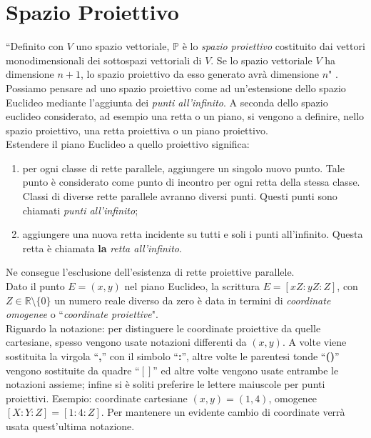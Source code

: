 \documentclass[a4paper,12pt]{tesiinfo}
\begin{document}
\section{Spazio Proiettivo}
``Definito con $V$ uno spazio vettoriale, $\mathbb{P}$ \`e lo \textit{spazio proiettivo} costituito dai vettori monodimensionali dei sottospazi vettoriali di $V$. Se lo spazio vettoriale $V$ ha dimensione $n+1$, lo spazio proiettivo da esso generato avr\`a dimensione $n$" \cite{baseTheory_ProjSpace}.
\\
Possiamo pensare ad uno spazio proiettivo come ad un'estensione dello spazio Euclideo mediante l'aggiunta dei \textit{punti all'infinito}. A seconda dello spazio euclideo considerato, ad esempio una retta o un piano, si vengono a definire, nello spazio proiettivo, una retta proiettiva o un piano proiettivo.
\\
Estendere il piano Euclideo \cite{baseTheory_Euclid2Proj_Space} a quello proiettivo significa:
\begin{enumerate}
 \item per ogni classe di rette parallele, aggiungere un singolo nuovo punto. Tale punto \`e considerato come punto di incontro per ogni retta della stessa classe. Classi di diverse rette parallele avranno diversi punti. Questi punti sono chiamati \textit{punti all'infinito};
 \item aggiungere una nuova retta incidente su tutti e soli i punti all'infinito. Questa retta \`e chiamata \textbf{la} \textit{retta all'infinito}.
\end{enumerate}
Ne consegue l'esclusione dell'esistenza di rette proiettive parallele.
\\
Dato il punto $E=(x, y)$ nel piano Euclideo, la scrittura $E=[xZ:yZ:Z]$, con $Z \in \mathbb{R} \setminus \{0\}$ un numero reale diverso da zero \`e data in termini di \textit{coordinate omogenee} o ``\textit{coordinate proiettive}".
\\
Riguardo la notazione: per distinguere le coordinate proiettive da quelle cartesiane, spesso vengono usate notazioni differenti da $(x, y)$. A volte viene sostituita la virgola ``\textbf{,}'' con il simbolo ``\textbf{:}'', altre volte le parentesi tonde ``\textbf{()}'' vengono sostituite da quadre ``\textbf{$\mathbb{[]}$}'' ed altre volte vengono usate entrambe le notazioni assieme; infine si \`e soliti preferire le lettere maiuscole per punti proiettivi. Esempio: coordinate cartesiane $(x, y) = (1, 4)$, omogenee $[X:Y:Z]=[1:4:Z]$. Per mantenere un evidente cambio di coordinate verr\`a usata quest'ultima notazione.
\end{document}
